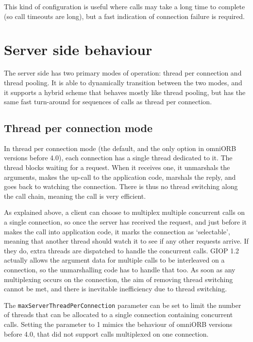 \documentclass[11pt,twoside,a4paper]{book}
\newcommand{\code}[1]{\texttt{#1}}
\begin{document}
This kind of configuration is useful where calls may take a long time
to complete (so call timeouts are long), but a fast indication of
connection failure is required.


\section{Server side behaviour}

The server side has two primary modes of operation: thread per
connection and thread pooling. It is able to dynamically transition
between the two modes, and it supports a hybrid scheme that behaves
mostly like thread pooling, but has the same fast turn-around for
sequences of calls as thread per connection.

\subsection{Thread per connection mode}

In thread per connection mode (the default, and the only option in
omniORB versions before 4.0), each connection has a single thread
dedicated to it. The thread blocks waiting for a request. When it
receives one, it unmarshals the arguments, makes the up-call to the
application code, marshals the reply, and goes back to watching the
connection. There is thus no thread switching along the call chain,
meaning the call is very efficient.

As explained above, a client can choose to multiplex multiple
concurrent calls on a single connection, so once the server has
received the request, and just before it makes the call into
application code, it marks the connection as `selectable', meaning
that another thread should watch it to see if any other requests
arrive. If they do, extra threads are dispatched to handle the
concurrent calls. GIOP 1.2 actually allows the argument data for
multiple calls to be interleaved on a connection, so the unmarshalling
code has to handle that too. As soon as any multiplexing occurs on the
connection, the aim of removing thread switching cannot be met, and
there is inevitable inefficiency due to thread switching.

The \code{maxServerThreadPerConnection} parameter can be set to limit
the number of threads that can be allocated to a single connection
containing concurrent calls. Setting the parameter to 1 mimics the
behaviour of omniORB versions before 4.0, that did not support
calls multiplexed on one connection.
\end{document}
